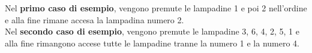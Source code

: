\Examples
\begin{example}
%
\end{example}
\begin{example}
%
\end{example}


\Explanation
Nel \textbf{primo caso di esempio}, vengono premute le lampadine 1 e poi 2 nell'ordine e alla fine rimane accesa la lampadina numero 2.\\[2mm]
Nel \textbf{secondo caso di esempio}, vengono premute le lampadine 3, 6, 4, 2, 5, 1 e alla fine rimangono accese tutte le lampadine tranne la numero 1 e la numero 4.
